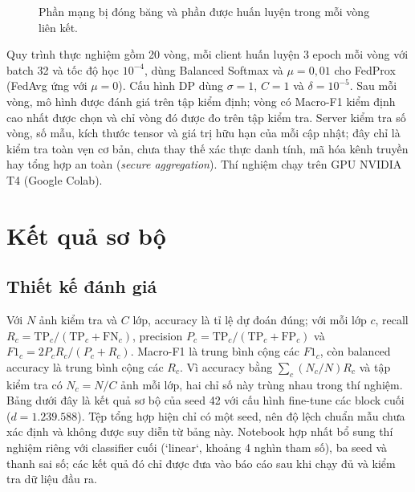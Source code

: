 \documentclass[12pt,a4paper]{report}
\begin{document}
\begin{figure}[H]\centering
{}
\caption{Phần mạng bị đóng băng và phần được huấn luyện trong mỗi vòng liên kết.}\label{fig:arch}
\end{figure}

Quy trình thực nghiệm gồm 20 vòng, mỗi client huấn luyện 3 epoch mỗi vòng với batch 32 và tốc độ học $10^{-4}$, dùng Balanced Softmax và $\mu=0{,}01$ cho FedProx (FedAvg ứng với $\mu=0$). Cấu hình DP dùng $\sigma=1$, $C=1$ và $\delta=10^{-5}$. Sau mỗi vòng, mô hình được đánh giá trên tập kiểm định; vòng có Macro-F1 kiểm định cao nhất được chọn và chỉ vòng đó được đo trên tập kiểm tra. Server kiểm tra số vòng, số mẫu, kích thước tensor và giá trị hữu hạn của mỗi cập nhật; đây chỉ là kiểm tra toàn vẹn cơ bản, chưa thay thế xác thực danh tính, mã hóa kênh truyền hay tổng hợp an toàn (\textit{secure aggregation}). Thí nghiệm chạy trên GPU NVIDIA T4 (Google Colab).

\chapter{Kết quả sơ bộ}
\section{Thiết kế đánh giá}
Với $N$ ảnh kiểm tra và $C$ lớp, accuracy là tỉ lệ dự đoán đúng; với mỗi lớp $c$, recall $R_c=\mathrm{TP}_c/(\mathrm{TP}_c+\mathrm{FN}_c)$, precision $P_c=\mathrm{TP}_c/(\mathrm{TP}_c+\mathrm{FP}_c)$ và $F1_c=2P_cR_c/(P_c+R_c)$. Macro-F1 là trung bình cộng các $F1_c$, còn balanced accuracy là trung bình cộng các $R_c$. Vì accuracy bằng $\sum_c (N_c/N)R_c$ và tập kiểm tra có $N_c=N/C$ ảnh mỗi lớp, hai chỉ số này trùng nhau trong thí nghiệm. Bảng dưới đây là kết quả sơ bộ của seed 42 với cấu hình fine-tune các block cuối ($d=1.239.588$). Tệp tổng hợp hiện chỉ có một seed, nên độ lệch chuẩn mẫu chưa xác định và không được suy diễn từ bảng này. Notebook hợp nhất bổ sung thí nghiệm riêng với classifier cuối (`linear`, khoảng 4 nghìn tham số), ba seed và thanh sai số; các kết quả đó chỉ được đưa vào báo cáo sau khi chạy đủ và kiểm tra dữ liệu đầu ra.
\end{document}
